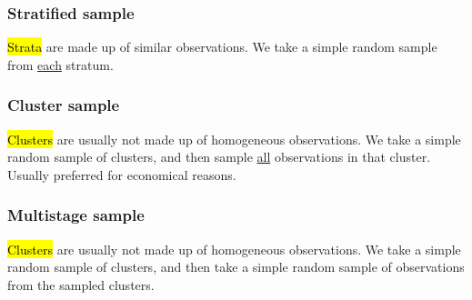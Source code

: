 \documentclass[slidestop,compress,mathserif]{beamer}
\begin{document}

\begin{frame}
	\frametitle{Stratified sample}

	\hl{Strata} are made up of similar observations. We take a simple random sample from \underline{each} stratum.

	\begin{center}
	\end{center}

\end{frame}


\begin{frame}
	\frametitle{Cluster sample}

	\hl{Clusters} are usually not made up of homogeneous observations. We take a simple random sample of clusters, and then sample \underline{all} observations in that cluster. Usually preferred for economical reasons.

	\begin{center}
	\end{center}

\end{frame}


\begin{frame}
	\frametitle{Multistage sample}

	\hl{Clusters} are usually not made up of homogeneous observations.  We take a simple random sample of clusters, and then take a simple random sample of observations from the sampled clusters.

	\begin{center}
	\end{center}

\end{frame}



\end{document}
